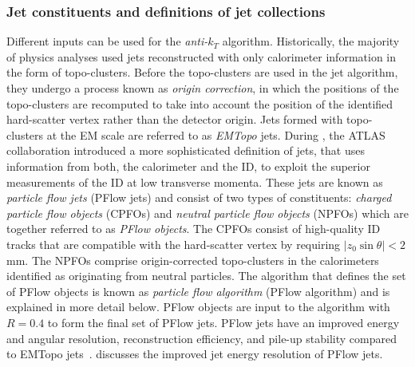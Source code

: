 \subsubsection{Jet constituents and definitions of jet collections}
Different inputs can be used for the \emph{anti-$k_T$} algorithm.
Historically, the majority of physics analyses used jets reconstructed with only calorimeter information in the form of topo-clusters.
Before the topo-clusters are used in the jet algorithm, they undergo a process known as \emph{origin correction}, in which the positions of the topo-clusters are recomputed to take into account the position of the identified hard-scatter vertex rather than the detector origin.
Jets formed with topo-clusters at the EM scale are referred to as \emph{EMTopo} jets.
During \RunTwo, the ATLAS collaboration introduced a more sophisticated definition of jets, that uses information from both, the calorimeter and the ID, to exploit the superior measurements of the ID at low transverse momenta.
These jets are known as \emph{particle flow jets} (PFlow jets) and consist of two types of constituents: \emph{charged particle flow objects} (CPFOs) and \emph{neutral particle flow objects} (NPFOs) which are together referred to as \emph{PFlow objects}. The CPFOs consist of high-quality ID tracks that are compatible with the hard-scatter vertex by requiring $|z_0 \sin \theta| < 2$\,mm.
The NPFOs comprise origin-corrected topo-clusters in the calorimeters identified as originating from neutral particles. The algorithm that defines the set of PFlow objects is known as \emph{particle flow algorithm} (PFlow algorithm) and is explained in more detail below. PFlow objects are input to the \antikt algorithm with $R = 0.4$ to form the final set of PFlow jets.
PFlow jets have an improved energy and angular resolution, reconstruction efficiency, and pile-up stability compared to EMTopo jets~\cite{PERF-2015-09}.
 discusses the improved jet energy resolution of PFlow jets.

